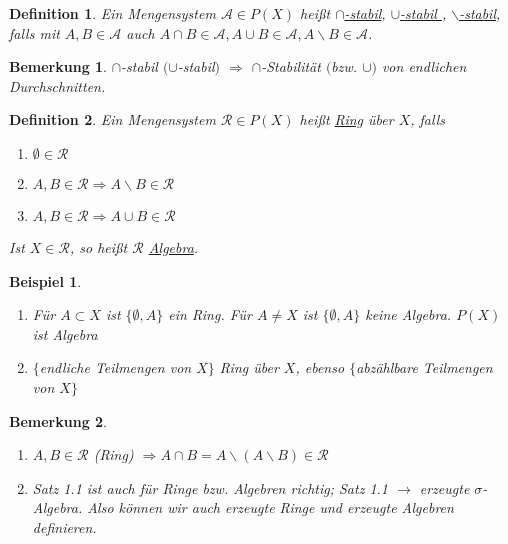 \documentclass[11pt]{memoir}
\theoremstyle{changebreak}
\newtheorem{Definition}{Definition}[chapter]
\newtheorem{Bemerkung}{Bemerkung}[chapter]
\newtheorem{Beispiel}{Beispiel}[chapter]
\begin{document}
\begin{Definition}
Ein Mengensystem $\mathscr A \in P(X)$ heißt \underline{$\cap$-stabil}, \underline{ $\cup$-stabil }, \underline{$\backslash$-stabil}, falls mit $A, B \in \mathscr A$ auch $A \cap B \in \mathscr A, A \cup B \in \mathscr A, A\backslash B \in \mathscr A$.
\end{Definition}

\begin{Bemerkung}
$\cap$-stabil $(\cup$-stabil$)$ $\Rightarrow$ $\cap$-Stabilität $($bzw. $\cup)$ von endlichen Durchschnitten.
\end{Bemerkung}

\begin{Definition}
Ein Mengensystem $\mathscr R \in P(X)$ heißt \underline{Ring} über $X$, falls
\begin{enumerate}
	\item $\emptyset \in \mathscr R$
	\item $A, B \in \mathscr R \Rightarrow A\backslash B \in \mathscr R$
	\item $A, B \in \mathscr R \Rightarrow A \cup B \in \mathscr R$
\end{enumerate}
Ist $X \in \mathscr R$, so heißt $\mathscr R$ \underline{Algebra}.
\end{Definition}


\begin{Beispiel}
\begin{enumerate}
	\item Für $A \subset X$ ist $\{\emptyset, A\}$ ein Ring. Für $A \ne X$ ist $\{\emptyset, A\}$ keine Algebra. $P(X)$ ist Algebra
	\item $\{$endliche Teilmengen von $X\}$ Ring über $X$, ebenso $\{ $abzählbare Teilmengen von $X\}$
\end{enumerate}
\end{Beispiel}

\begin{Bemerkung}
\begin{enumerate}
	\item $A, B \in \mathscr R$ (Ring) $\Rightarrow A \cap B = A \backslash (A \backslash B) \in \mathscr R$
	 \item Satz 1.1 ist auch für Ringe bzw. Algebren richtig; Satz 1.1 $\rightarrow$ erzeugte $\sigma$-Algebra. Also können wir auch erzeugte Ringe und erzeugte Algebren definieren.
\end{enumerate}
\end{Bemerkung}
\end{document}
